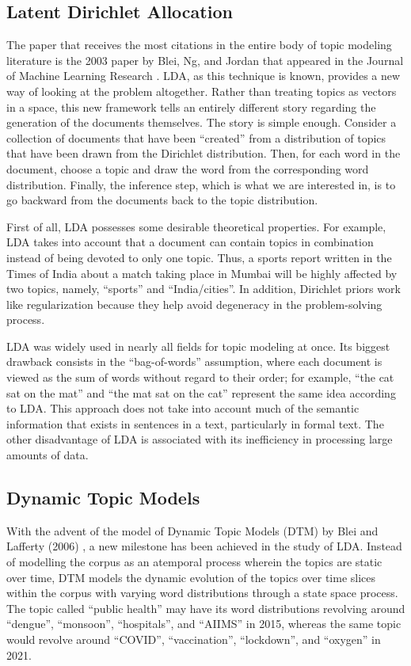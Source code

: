 \subsection{Latent Dirichlet Allocation}
The paper that receives the most citations in the entire body of topic modeling literature is the 2003 paper by Blei, Ng, and Jordan that appeared in the Journal of Machine Learning Research \cite{blei2003}. LDA, as this technique is known, provides a new way of looking at the problem altogether. Rather than treating topics as vectors in a space, this new framework tells an entirely different story regarding the generation of the documents themselves. The story is simple enough. Consider a collection of documents that have been ``created'' from a distribution of topics that have been drawn from the Dirichlet distribution. Then, for each word in the document, choose a topic and draw the word from the corresponding word distribution. Finally, the inference step, which is what we are interested in, is to go backward from the documents back to the topic distribution.

First of all, LDA possesses some desirable theoretical properties. For example, LDA takes into account that a document can contain topics in combination instead of being devoted to only one topic. Thus, a sports report written in the Times of India about a match taking place in Mumbai will be highly affected by two topics, namely, ``sports'' and ``India/cities''. In addition, Dirichlet priors work like regularization because they help avoid degeneracy in the problem-solving process.

LDA was widely used in nearly all fields for topic modeling at once. Its biggest drawback consists in the ``bag-of-words'' assumption, where each document is viewed as the sum of words without regard to their order; for example, ``the cat sat on the mat'' and ``the mat sat on the cat'' represent the same idea according to LDA. This approach does not take into account much of the semantic information that exists in sentences in a text, particularly in formal text. The other disadvantage of LDA is associated with its inefficiency in processing large amounts of data.

\subsection{Dynamic Topic Models}
With the advent of the model of Dynamic Topic Models (DTM) by Blei and Lafferty (2006) \cite{blei2006}, a new milestone has been achieved in the study of LDA. Instead of modelling the corpus as an atemporal process wherein the topics are static over time, DTM models the dynamic evolution of the topics over time slices within the corpus with varying word distributions through a state space process. The topic called ``public health'' may have its word distributions revolving around ``dengue'', ``monsoon'', ``hospitals'', and ``AIIMS'' in 2015, whereas the same topic would revolve around ``COVID'', ``vaccination'', ``lockdown'', and ``oxygen'' in 2021.


